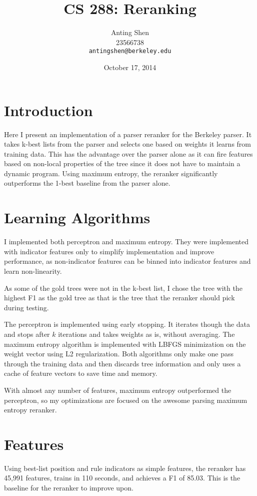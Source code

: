 \documentclass[11pt]{article}
\title{CS 288: Reranking}
\author{Anting Shen \\
  23566738 \\
  {\tt antingshen@berkeley.edu} \\
}
\date{October 17, 2014}
\begin{document}
\maketitle

\section{Introduction}

Here I present an implementation of a parser reranker for the Berkeley parser. It takes
k-best lists from the parser and selects one based on weights it learns from training data.
This has the advantage over the parser alone as it can fire features based on non-local
properties of the tree since it does not have to maintain a dynamic program.
Using maximum entropy, the reranker significantly outperforms the 1-best baseline from
the parser alone.


\section{Learning Algorithms}

I implemented both perceptron and maximum entropy. They were implemented with indicator features
only to simplify implementation and improve performance, as non-indicator features can be binned
into indicator features and learn non-linearity. 

As some of the gold trees were not in the k-best list, I chose the tree with the highest F1
as the gold tree as that is the tree that the reranker should pick during testing. 

The perceptron is implemented using early stopping. It iterates though the data and stops after
$k$ iterations and takes weights as is, without averaging. The maximum entropy algorithm is 
implemented with LBFGS minimization on the weight vector using L2 regularization. Both
algorithms only make one pass through the training data and then discards tree information
and only uses a cache of feature vectors to save time and memory. 

With almost any number of features, maximum entropy outperformed the perceptron, so my
optimizations are focused on the awesome parsing maximum entropy reranker. 


\section{Features}

Using best-list position and rule indicators as simple features, the reranker has 45,991 features,
trains in 110 seconds, and achieves a F1 of 85.03. This is the baseline for the reranker to improve upon.
\end{document}
